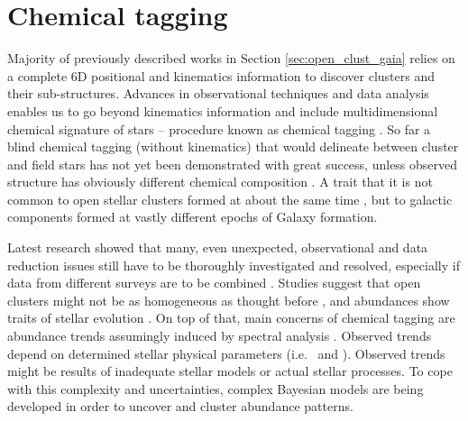 \section{Chemical tagging}
Majority of previously described works in Section \ref{sec:open_clust_gaia} relies on a complete 6D positional and kinematics information to discover clusters and their sub-structures. Advances in observational techniques and data analysis enables us to go beyond kinematics information and include multidimensional chemical signature of stars -- procedure known as chemical tagging \citep{2002ARA&A..40..487F, 2010ApJ...721..582B}. So far a blind chemical tagging (without kinematics) that would delineate between cluster and field stars has not yet been demonstrated with great success, unless observed structure has obviously different chemical composition \citep{2016ApJ...833..262H}. A trait that it is not common to open stellar clusters formed at about the same time \citep{2019A&A...629A..34G}, but to galactic components formed at vastly different epochs \citep{2018A&A...619A.125A} of Galaxy formation.

Latest research showed that many, even unexpected, observational and data reduction issues still have to be thoroughly investigated and resolved, especially if data from different surveys are to be combined \citep{2019ARA&A..57..571J}. Studies suggest that open clusters might not be as homogeneous as thought before \citep{2016ApJ...817...49B, 2018MNRAS.473.4612K}, and abundances show traits of stellar evolution \citep{2015A&A...577A..47B, 2017ApJ...840...99D, 2018MNRAS.478..425B}. On top of that, main concerns of chemical tagging are abundance trends assumingly induced by spectral analysis \citep{2016ApJ...817...49B, 2019arXiv191208539C, 2020arXiv200103179B}. Observed trends depend on determined stellar physical parameters (i.e. \Teff\ and \vsin). Observed trends might be results of inadequate stellar models or actual stellar processes. To cope with this complexity and uncertainties, complex Bayesian models are being developed \citep{2016ApJ...817...49B, 2019ApJ...887...73C} in order to uncover and cluster abundance patterns.

